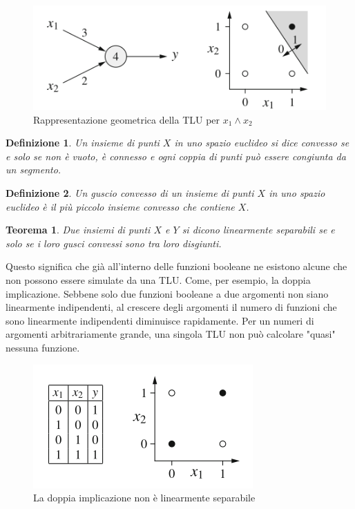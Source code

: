 \documentclass[10pt,a4paper]{article}
\newtheorem{definition}{Definizione}
\newtheorem{theorem}{Teorema}
\begin{document}
\begin{figure}
\centering
\includegraphics[scale=0.5]{img/geometria.png}
\caption{Rappresentazione geometrica della TLU per $x_1 \land x_2$}
\label{fig:2}
\end{figure}

\begin{definition}
Un insieme di punti $X$ in uno spazio euclideo si dice \emph{convesso} se e solo se non è vuoto, è connesso e ogni coppia di punti può essere congiunta da un segmento.
\end{definition}
\begin{definition}
Un \emph{guscio convesso} di un insieme di punti $X$ in uno spazio euclideo è il più piccolo insieme convesso che contiene $X$.
\end{definition}
\begin{theorem}
Due insiemi di punti $X$ e $Y$ si dicono linearmente separabili se e solo se i loro gusci convessi sono tra loro disgiunti.
\end{theorem}

Questo significa che già all'interno delle funzioni booleane ne esistono alcune che non possono essere simulate da una TLU. Come, per esempio, la doppia implicazione. Sebbene solo due funzioni booleane a due argomenti non siano linearmente indipendenti, al crescere degli argomenti il numero di funzioni che sono linearmente indipendenti diminuisce rapidamente. Per un numeri di argomenti arbitrariamente grande, una singola TLU non può calcolare "quasi" nessuna funzione.

\begin{figure}
\centering
\includegraphics[scale=0.5]{img/doppiaimplicazione.png}
\caption{La doppia implicazione non è linearmente separabile}
\label{fig:3}
\end{figure}
\end{document}
